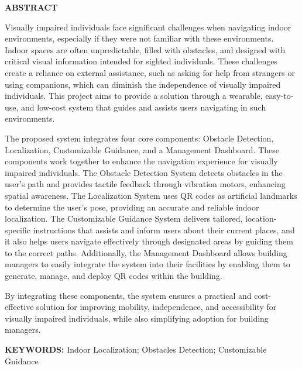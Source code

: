 

\newpage
\thispagestyle{plain}
\setcounter{page}{1}
\renewcommand{\thepage}{\roman{page}}

\begin{center}
    \Large\textbf{ABSTRACT}
\end{center}
\vspace{6pt}
Visually impaired individuals face significant challenges when navigating indoor environments, especially if they were not familiar with these environments. Indoor spaces are often unpredictable, filled with obstacles, and designed with critical visual information intended for sighted individuals. These challenges create a reliance on external assistance, such as asking for help from strangers or using companions, which can diminish the independence of visually impaired individuals. This project aims to provide a solution through a wearable, easy-to-use, and low-cost system that guides and assists users navigating in such environments. 

The proposed system integrates four core components: Obstacle Detection, Localization, Customizable Guidance, and a Management Dashboard. These components work together to enhance the navigation experience for visually impaired individuals. The Obstacle Detection System detects obstacles in the user’s path and provides tactile feedback through vibration motors, enhancing spatial awareness. The Localization System uses QR codes as artificial landmarks to determine the user's pose, providing an accurate and reliable indoor localization. The Customizable Guidance System delivers tailored, location-specific instructions that assists and inform users about their current places, and it also helps users navigate effectively through designated areas by guiding them to the correct paths. Additionally, the Management Dashboard allows building managers to easily integrate the system into their facilities by enabling them to generate, manage, and deploy QR codes within the building.

By integrating these components, the system ensures a practical and cost-effective solution for improving mobility, independence, and accessibility for visually impaired individuals, while also simplifying adoption for building managers.

\vspace{18pt}
\noindent
\textbf{KEYWORDS:} Indoor Localization; Obstacles Detection; Customizable Guidance
\vspace{3\baselineskip}